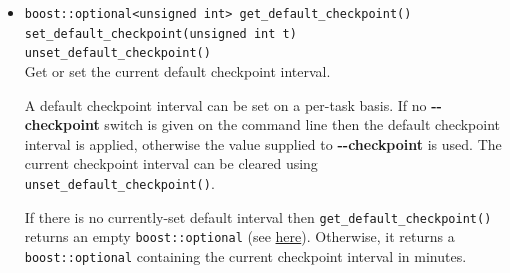 \documentclass[11pt,a4paper]{article}
\newcommand{\packagefont}{\sffamily}
\newcommand{\CppTransport}{{\packagefont CppTransport}}
\newcommand{\SQLite}{{\packagefont SQLite}}
\newcommand{\option}[1]{{\ttfamily\bfseries\small #1}}
\begin{document}
\begin{itemize}
    To assist comparison of the results produced by {\CppTransport} with
    other methods of computing $n$-point functions,
    it is possible to have {\CppTransport} write extra
    table sinto the {\SQLite} container which gives the field-values
    at horizon exit for each configuration.
    For tasks computing the 2-point function only,
    {\CppTransport} will write a table called
    \texttt{horizon_exit_values}
    which
    fields values at horizon exit for the corresponding wavenumber.
    For tasks computing the 3-point function {\CppTransport}
    writes two tables:
    for each configuration,
    \texttt{horizon_exit_values}
    contains field values at horizon-exit for the
    wavenumber which exits
    earliest.
    In addition \texttt{kt_horizon_exit_values}
    contains the field values at horizon-exit for the
    average scale $k_t/3$.
    
    Note that these are \emph{not} the initial conditions used
    by {\CppTransport} internally.
    
    \item \texttt{boost::optional<unsigned int> get_default_checkpoint()} \\
    \texttt{set_default_checkpoint(unsigned int t)} \\
    \texttt{unset_default_checkpoint()} \\
    Get or set the current default checkpoint interval.
    
    A default checkpoint interval can be set on a per-task basis.
    If no \option{{-}{-}checkpoint} switch is given on the command line then
    the default checkpoint interval is applied, otherwise the value
    supplied to \option{{-}{-}checkpoint} is used.
    The current checkpoint interval can be cleared
    using
    \texttt{unset_default_checkpoint()}.
    
    If there is no currently-set default interval then
    \texttt{get_default_checkpoint()} returns an empty
    \texttt{boost::optional}
    (see \href{http://www.boost.org/doc/libs/1_60_0/libs/optional/doc/html/index.html}{here}).
    Otherwise, it returns a
    \texttt{boost::optional} containing the current
    checkpoint interval in minutes.
    
\end{itemize}
\end{document}

